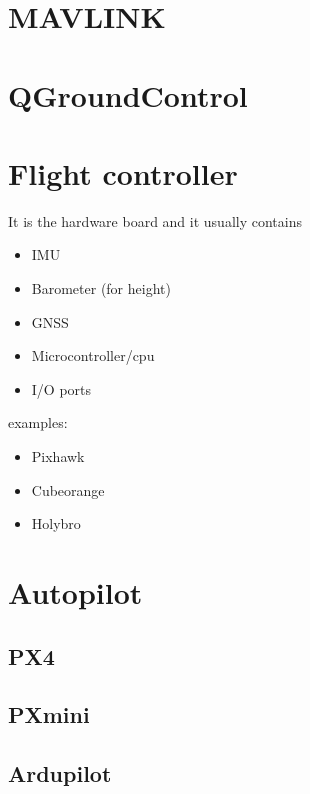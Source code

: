 \section{MAVLINK}
\section{QGroundControl}
\section{Flight controller}
    It is the hardware board and it usually contains
    \begin{itemize}
        \item IMU
        \item Barometer (for height)
        \item GNSS
        \item Microcontroller/cpu
        \item I/O ports
    \end{itemize}

    examples:
    \begin{itemize}
        \item Pixhawk
        \item Cubeorange
        \item Holybro
    \end{itemize}

\section{Autopilot}
    \subsection{PX4}
        \subsection{PXmini}
    \subsection{Ardupilot}